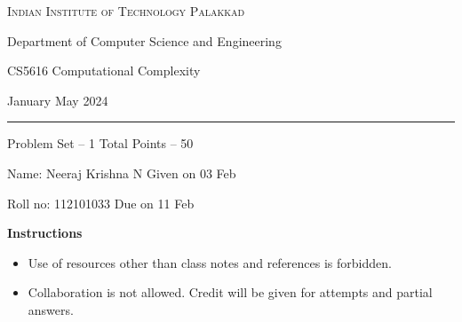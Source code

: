 \documentclass[11pt, a4paper,answers]{exam}
\begin{document}
	
	\noindent
	\begin{minipage}[l]{0.1\textwidth}
		\noindent
	\end{minipage}
	\hfill
	\begin{minipage}[c]{0.8\textwidth}
		\begin{center}
			{\large \textsc{\textcolor{iitpkdcolor}{Indian Institute of Technology Palakkad}} \par
				\small	Department of Computer Science and Engineering	\par
				\large	CS5616 Computational Complexity \par 
				\small January May 2024}
		\end{center}
	\end{minipage}
	\par
	\vspace{2mm}
	\hrule
	\vspace{2mm}
	\begin{minipage}{0.9\textwidth} 
		\textsf{Problem Set} -- 1  \hfill  \textsf{Total Points} -- 50
		
		{\small \textsf{Name}: Neeraj Krishna N \hfill \small \textsf{Given on} 03 Feb}
		
		{\small \textsf{Roll no}: 112101033 \hfill \small \textsf{Due on} 11 Feb}
	\end{minipage}
	\vspace{0.2in}
	\noindent
	
	\textbf{Instructions}
	\begin{itemize}   \setlength\itemsep{0.1mm}
		\item {\sf  Use of resources other than class notes and references is forbidden.}
		\item {\sf Collaboration is not allowed. Credit will be given for attempts and partial answers.}
	\end{itemize}
\end{document}
